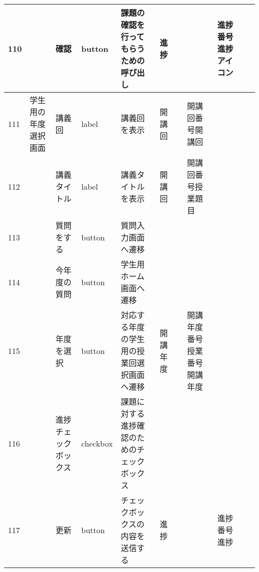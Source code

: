 \begin{landscape}
\begin{table}[]
\begin{tabular}{|l|l|l|l|l|l|l|l|l|l|l|}
110 &               & 確認               & button   & 課題の確認を行ってもらうための呼び出し                                               & 進捗      &                       &                    & 進捗番号進捗アイコン      &                               &                                                                \\ \hline
111 & 学生用の年度選択画面    & 講義回              & label    & 講義回を表示                                                            & 開講回     &                       & 開講回番号開講回           &                 &                               &                                                                \\ \hline
112 &               & 講義タイトル           & label    & 講義タイトルを表示                                                         & 開講回     &                       & 開講回番号授業題目          &                 &                               &                                                                \\ \hline
113 &               & 質問をする            & button   & 質問入力画面へ遷移                                                         &         &                       &                    &                 &                               &                                                                \\ \hline
114 &               & 今年度の質問           & button   & 学生用ホーム画面へ遷移                                                       &         &                       &                    &                 &                               &                                                                \\ \hline
115 &               & 年度を選択            & button   & 対応する年度の学生用の授業回選択画面へ遷移                                             & 開講年度    &                       & 開講年度番号授業番号開講年度     &                 &                               &                                                                \\ \hline
116 &               & 進捗チェックボックス       & checkbox & 課題に対する進捗確認のためのチェックボックス                                            &         &                       &                    &                 &                               &                                                                \\ \hline
117 &               & 更新               & button   & チェックボックスの内容を送信する                                                  & 進捗      &                       &                    & 進捗番号進捗          &                               &                                                                \\ \hline

\end{tabular}
\end{table}
\end{landscape}
